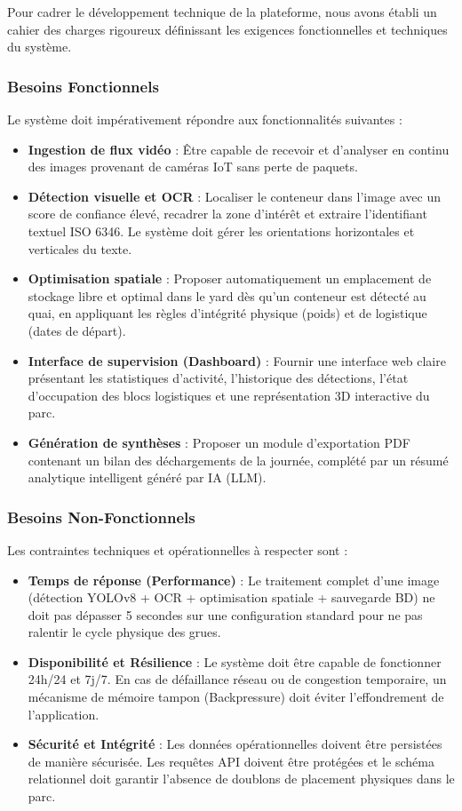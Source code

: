 \documentclass[12pt,a4paper]{article}
\begin{document}
Pour cadrer le développement technique de la plateforme, nous avons établi un cahier des charges rigoureux définissant les exigences fonctionnelles et techniques du système.

\subsubsection{Besoins Fonctionnels}
Le système doit impérativement répondre aux fonctionnalités suivantes :
\begin{itemize}
  \item \textbf{Ingestion de flux vidéo} : Être capable de recevoir et d'analyser en continu des images provenant de caméras IoT sans perte de paquets.
  \item \textbf{Détection visuelle et OCR} : Localiser le conteneur dans l'image avec un score de confiance élevé, recadrer la zone d'intérêt et extraire l'identifiant textuel ISO 6346. Le système doit gérer les orientations horizontales et verticales du texte.
  \item \textbf{Optimisation spatiale} : Proposer automatiquement un emplacement de stockage libre et optimal dans le yard dès qu'un conteneur est détecté au quai, en appliquant les règles d'intégrité physique (poids) et de logistique (dates de départ).
  \item \textbf{Interface de supervision (Dashboard)} : Fournir une interface web claire présentant les statistiques d'activité, l'historique des détections, l'état d'occupation des blocs logistiques et une représentation 3D interactive du parc.
  \item \textbf{Génération de synthèses} : Proposer un module d'exportation PDF contenant un bilan des déchargements de la journée, complété par un résumé analytique intelligent généré par IA (LLM).
\end{itemize}

\subsubsection{Besoins Non-Fonctionnels}
Les contraintes techniques et opérationnelles à respecter sont :
\begin{itemize}
  \item \textbf{Temps de réponse (Performance)} : Le traitement complet d'une image (détection YOLOv8 + OCR + optimisation spatiale + sauvegarde BD) ne doit pas dépasser 5 secondes sur une configuration standard pour ne pas ralentir le cycle physique des grues.
  \item \textbf{Disponibilité et Résilience} : Le système doit être capable de fonctionner 24h/24 et 7j/7. En cas de défaillance réseau ou de congestion temporaire, un mécanisme de mémoire tampon (Backpressure) doit éviter l'effondrement de l'application.
  \item \textbf{Sécurité et Intégrité} : Les données opérationnelles doivent être persistées de manière sécurisée. Les requêtes API doivent être protégées et le schéma relationnel doit garantir l'absence de doublons de placement physiques dans le parc.
\end{itemize}
\end{document}
